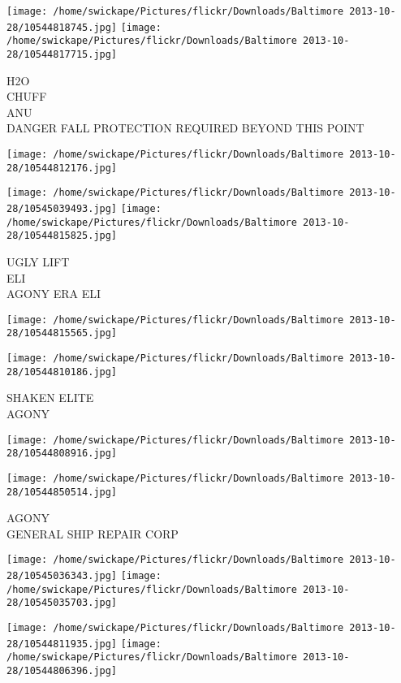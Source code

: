 \documentclass[10pt,letterpaper]{article}
\begin{document}
\texttt{[image: /home/swickape/Pictures/flickr/Downloads/Baltimore 2013-10-28/10544818745.jpg]}
\texttt{[image: /home/swickape/Pictures/flickr/Downloads/Baltimore 2013-10-28/10544817715.jpg]}

H2O\\
CHUFF\\
ANU\\
DANGER FALL PROTECTION REQUIRED BEYOND THIS POINT\\
\pagebreak

\texttt{[image: /home/swickape/Pictures/flickr/Downloads/Baltimore 2013-10-28/10544812176.jpg]}

\vspace{0.25in}
\texttt{[image: /home/swickape/Pictures/flickr/Downloads/Baltimore 2013-10-28/10545039493.jpg]}
\texttt{[image: /home/swickape/Pictures/flickr/Downloads/Baltimore 2013-10-28/10544815825.jpg]}

UGLY LIFT\\
ELI\\
AGONY ERA ELI\\
\pagebreak

\texttt{[image: /home/swickape/Pictures/flickr/Downloads/Baltimore 2013-10-28/10544815565.jpg]}

\vspace{0.25in}
\texttt{[image: /home/swickape/Pictures/flickr/Downloads/Baltimore 2013-10-28/10544810186.jpg]}

SHAKEN ELITE\\
AGONY\\
\pagebreak

\texttt{[image: /home/swickape/Pictures/flickr/Downloads/Baltimore 2013-10-28/10544808916.jpg]}

\vspace{0.25in}
\texttt{[image: /home/swickape/Pictures/flickr/Downloads/Baltimore 2013-10-28/10544850514.jpg]}

AGONY\\
GENERAL SHIP REPAIR CORP\\
\pagebreak

\texttt{[image: /home/swickape/Pictures/flickr/Downloads/Baltimore 2013-10-28/10545036343.jpg]}
\texttt{[image: /home/swickape/Pictures/flickr/Downloads/Baltimore 2013-10-28/10545035703.jpg]}

\texttt{[image: /home/swickape/Pictures/flickr/Downloads/Baltimore 2013-10-28/10544811935.jpg]}
\texttt{[image: /home/swickape/Pictures/flickr/Downloads/Baltimore 2013-10-28/10544806396.jpg]}
\end{document}
